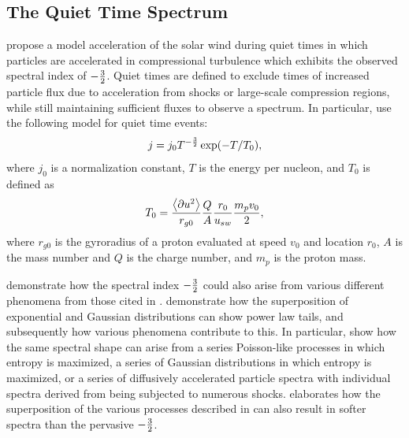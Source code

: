 \documentclass[letterpaper,11pt]{article}
\begin{document}

\subsection{The Quiet Time Spectrum}
\citet{Fisk2008} propose a model acceleration of the solar wind during quiet times in which particles are accelerated in compressional turbulence which exhibits the observed spectral index of $-{3 \over 2}$.  Quiet times are defined to exclude times of increased particle flux due to acceleration from shocks or large-scale compression regions, while still maintaining sufficient fluxes to observe a spectrum.  In particular, \citet{Fisk2008} use the following model for quiet time events:
\begin{equation}
j = j_0 T^{-{3 \over 2}} \exp(-T / T_0),
\label{eqn:flux}
\end{equation}
where $j_0$ is a normalization constant, $T$ is the energy per nucleon, and $T_0$ is defined as
\begin{equation}
T_0 = \frac{\left \langle \partial u^2 \right \rangle}{r_{g0}}{Q \over A}{r_0 \over u_{sw}}{m_p v_0 \over 2},
\end{equation}
where $r_{g0}$ is the gyroradius of a proton evaluated at speed $v_0$ and location $r_0$, $A$ is the mass number and $Q$ is the charge number, and $m_p$ is the proton mass.

\citet{Schwadron2010} demonstrate how the spectral index $-{3 \over 2}$ could also arise from various different phenomena from those cited in \citet{Fisk2008}.  \citet{Schwadron2010} demonstrate how the superposition of exponential and Gaussian distributions can show power law tails, and subsequently how various phenomena contribute to this.  In particular, \citet{Schwadron2010} show how the same spectral shape can arise from a series Poisson-like processes in which entropy is maximized, a series of Gaussian distributions in which entropy is maximized, or a series of diffusively accelerated particle spectra with individual spectra derived from being subjected to numerous shocks.  \citet{Schwadron2019AGU} elaborates how the superposition of the various processes described in \citet{Schwadron2010} can also result in softer spectra than the pervasive $-{3 \over 2}$.
\end{document}
